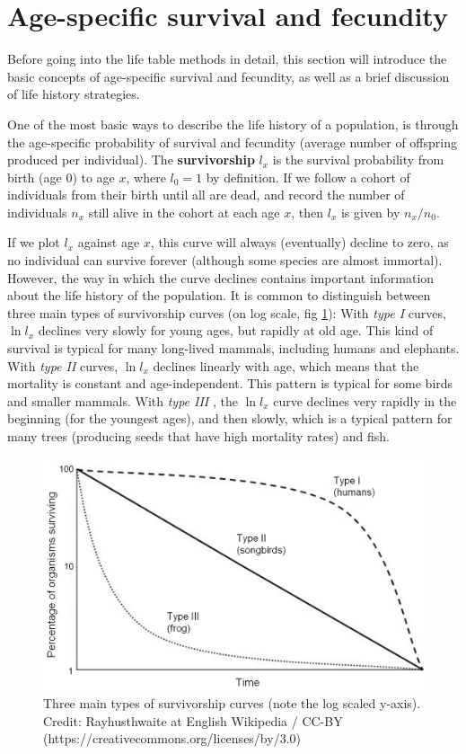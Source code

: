 \documentclass[
]{book}
\begin{document}
\hypertarget{age-specific-survival-and-fecundity}{%
\section{Age-specific survival and fecundity}\label{age-specific-survival-and-fecundity}}

Before going into the life table methods in detail, this section will introduce the basic concepts of age-specific survival and fecundity, as well as a brief discussion of life history strategies.

One of the most basic ways to describe the life history of a population, is through the age-specific probability of survival and fecundity (average number of offspring produced per individual). The \textbf{survivorship} \(l_x\) is the survival probability from birth (age 0) to age \(x\), where \(l_0=1\) by definition. If we follow a cohort of individuals from their birth until all are dead, and record the number of individuals \(n_x\) still alive in the cohort at each age \(x\), then \(l_x\) is given by \(n_x/n_0\).

If we plot \(l_x\) against age \(x\), this curve will always (eventually) decline to zero, as no individual can survive forever (although some species are almost immortal). However, the way in which the curve declines contains important information about the life history of the population. It is common to distinguish between three main types of survivorship curves (on log scale, fig \ref{fig:fig1}): With \emph{type I} curves, \(\ln l_x\) declines very slowly for young ages, but rapidly at old age. This kind of survival is typical for many long-lived mammals, including humans and elephants. With \emph{type II} curves, \(\ln l_x\) declines linearly with age, which means that the mortality is constant and age-independent. This pattern is typical for some birds and smaller mammals. With \emph{type III} , the \(\ln l_x\) curve declines very rapidly in the beginning (for the youngest ages), and then slowly, which is a typical pattern for many trees (producing seeds that have high mortality rates) and fish.

\begin{figure}
\includegraphics[width=0.7\linewidth]{Survivorship_Curves} \caption{Three main types of survivorship curves (note the log scaled y-axis). Credit: Rayhusthwaite at English Wikipedia / CC-BY (https://creativecommons.org/licenses/by/3.0)}\label{fig:fig1}
\end{figure}
\end{document}
